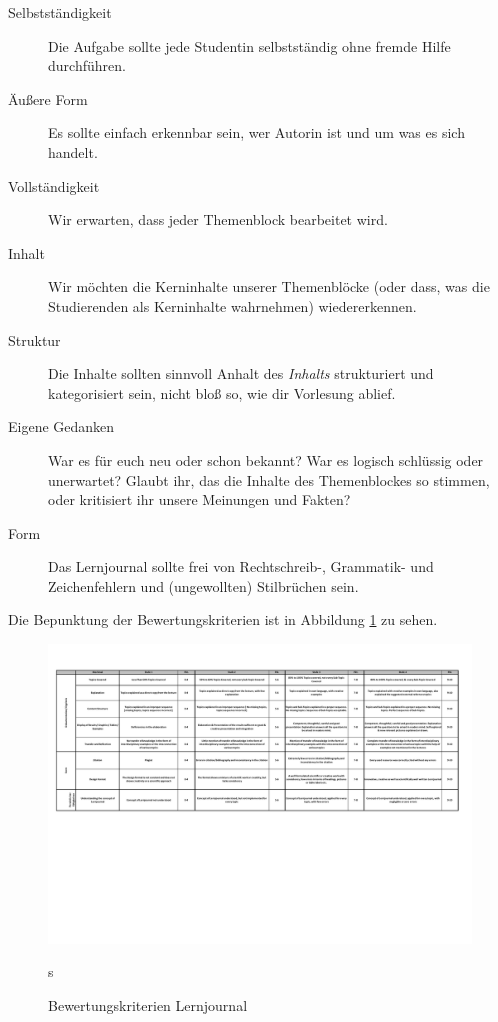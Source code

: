 \documentclass[DIV=15,headinclude]{scrartcl}
\begin{document}
\begin{description}
	\item[Selbstständigkeit] Die Aufgabe sollte jede Studentin selbstständig ohne fremde Hilfe durchführen.
	\item[Äußere Form] Es sollte einfach erkennbar sein, wer Autorin ist und um was es sich handelt.
	\item[Vollständigkeit] Wir erwarten, dass jeder Themenblock bearbeitet wird.
	\item[Inhalt] Wir möchten die Kerninhalte unserer Themenblöcke (oder dass, was die Studierenden als Kerninhalte wahrnehmen) wiedererkennen.
	\item[Struktur] Die Inhalte sollten sinnvoll Anhalt des \emph{Inhalts} strukturiert und kategorisiert sein, nicht bloß so, wie dir Vorlesung ablief.
	\item[Eigene Gedanken] War es für euch neu oder schon bekannt? War es logisch schlüssig oder unerwartet? Glaubt ihr, das die Inhalte des Themenblockes so stimmen, oder kritisiert ihr unsere Meinungen und Fakten?
	\item[Form] Das Lernjournal sollte frei von Rechtschreib-, Grammatik- und Zeichenfehlern und (ungewollten) Stilbrüchen sein.
\end{description}

Die Bepunktung der Bewertungskriterien ist in Abbildung \ref{abb:lernjournal} zu sehen.

\begin{figure}
  \includegraphics[width=\linewidth]{lernjournal}
  \caption{Bewertungskriterien Lernjournal}s
  \label{abb:lernjournal}
\end{figure}
\end{document}
